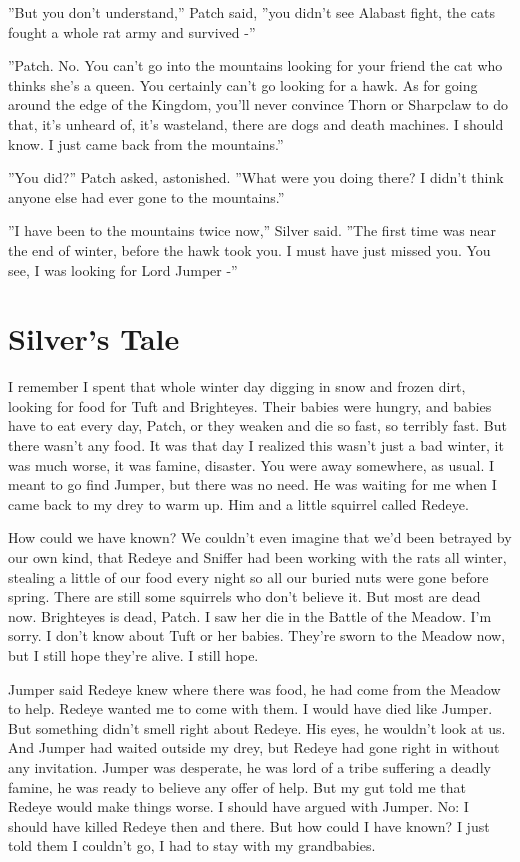 \documentclass[12pt]{book}
\begin{document}
''But you don't understand,'' Patch said, ''you didn't see Alabast fight, the cats fought a whole rat army and survived -''

''Patch. No. You can't go into the mountains looking for your friend the cat who thinks she's a queen. You certainly can't go looking for a hawk. As for going around the edge of the Kingdom, you'll never convince Thorn or Sharpclaw to do that, it's unheard of, it's wasteland, there are dogs and death machines. I should know. I just came back from the mountains.''

''You did?'' Patch asked, astonished. ''What were you doing there? I didn't think anyone else had ever gone to the mountains.''

''I have been to the mountains twice now,'' Silver said. ''The first time was near the end of winter, before the hawk took you. I must have just missed you. You see, I was looking for Lord Jumper -''


\section{Silver's Tale}

I remember I spent that whole winter day digging in snow and frozen dirt, looking for food for Tuft and Brighteyes. Their babies were hungry, and babies have to eat every day, Patch, or they weaken and die so fast, so terribly fast. But there wasn't any food. It was that day I realized this wasn't just a bad winter, it was much worse, it was famine, disaster. You were away somewhere, as usual. I meant to go find Jumper, but there was no need. He was waiting for me when I came back to my drey to warm up. Him and a little squirrel called Redeye.

How could we have known? We couldn't even imagine that we'd been betrayed by our own kind, that Redeye and Sniffer had been working with the rats all winter, stealing a little of our food every night so all our buried nuts were gone before spring. There are still some squirrels who don't believe it. But most are dead now. Brighteyes is dead, Patch. I saw her die in the Battle of the Meadow. I'm sorry. I don't know about Tuft or her babies. They're sworn to the Meadow now, but I still hope they're alive. I still hope.

Jumper said Redeye knew where there was food, he had come from the Meadow to help. Redeye wanted me to come with them. I would have died like Jumper. But something didn't smell right about Redeye. His eyes, he wouldn't look at us. And Jumper had waited outside my drey, but Redeye had gone right in without any invitation. Jumper was desperate, he was lord of a tribe suffering a deadly famine, he was ready to believe any offer of help. But my gut told me that Redeye would make things worse. I should have argued with Jumper. No: I should have killed Redeye then and there. But how could I have known? I just told them I couldn't go, I had to stay with my grandbabies.
\end{document}
